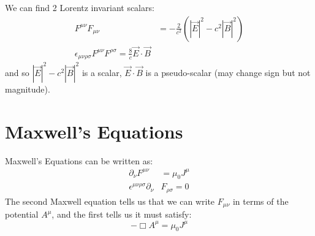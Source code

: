 \documentclass[../Main.tex]{subfiles}
\begin{document}
We can find 2 Lorentz invariant scalars:
\begin{align*}
    F^{\mu\nu}F_{\mu\nu} &= -\frac{2}{c^2}\left(|\vec{E}|^2 - c^2 |\vec{B}|^2\right) \\
    \epsilon_{\mu\nu\rho\sigma} F^{\mu\nu}F^{\rho\sigma} = \frac{8}{c} \vec{E} \cdot \vec{B}
\end{align*}
and so $|\vec{E}|^2 - c^2 |\vec{B}|^2$ is a scalar, $\vec{E} \cdot \vec{B}$ is a pseudo-scalar (may change sign but not magnitude).
\section{Maxwell's Equations}
Maxwell's Equations can be written as:
\begin{align*}
    \partial_\nu F^{\mu \nu} &= \mu_0 J^\mu \\
    \epsilon^{\mu\nu\rho\sigma} \partial_\nu&F_{\rho\sigma} = 0
\end{align*}
The second Maxwell equation tells us that we can write $F_{\mu\nu}$ in terms of the potential $A^\mu$, and the first tells us it must satisfy:
\begin{equation*}
    -\Box A^\mu = \mu_0 J^\mu
\end{equation*}
\end{document}
